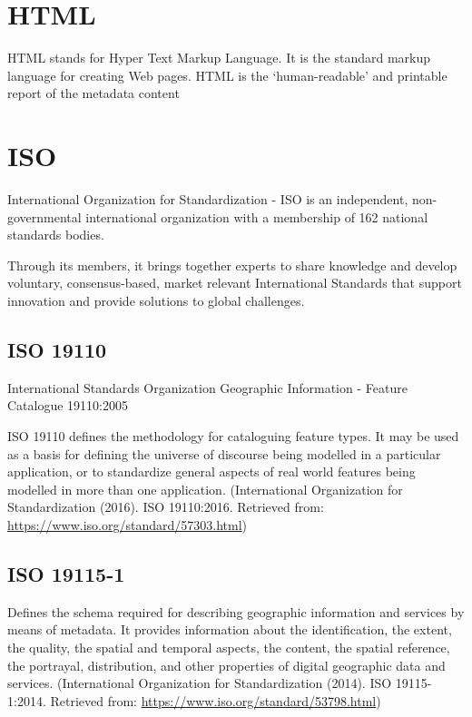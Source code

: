 \documentclass[
]{book}
\begin{document}
\hypertarget{html}{%
\section{HTML}\label{html}}

HTML stands for Hyper Text Markup Language. It is the standard markup language for creating Web pages. HTML is the `human-readable' and printable report of the metadata content

\hypertarget{iso}{%
\section{ISO}\label{iso}}

International Organization for Standardization - ISO is an independent, non-governmental international organization with a membership of 162 national standards bodies.

Through its members, it brings together experts to share knowledge and develop voluntary, consensus-based, market relevant International Standards that support innovation and provide solutions to global challenges.

\hypertarget{iso-19110}{%
\subsection{ISO 19110}\label{iso-19110}}

International Standards Organization Geographic Information - Feature Catalogue 19110:2005

ISO 19110 defines the methodology for cataloguing feature types. It may be used as a basis for defining the universe of discourse being modelled in a particular application, or to standardize general aspects of real world features being modelled in more than one application. (International Organization for Standardization (2016). ISO 19110:2016. Retrieved from: \url{https://www.iso.org/standard/57303.html})

\hypertarget{iso-19115-1}{%
\subsection{ISO 19115-1}\label{iso-19115-1}}

Defines the schema required for describing geographic information and services by means of metadata. It provides information about the identification, the extent, the quality, the spatial and temporal aspects, the content, the spatial reference, the portrayal, distribution, and other properties of digital geographic data and services. (International Organization for Standardization (2014). ISO 19115-1:2014. Retrieved from: \url{https://www.iso.org/standard/53798.html})
\end{document}
